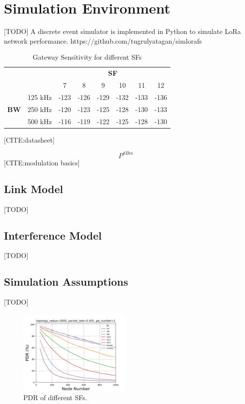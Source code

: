 \documentclass[conference]{IEEEtran}
\begin{document}
\section{Simulation Environment} \label{Simulation Environment}
[TODO] A discrete event simulator is implemented in Python to simulate LoRa network performance. https://github.com/tugrulyatagan/simlorafs

\begin{table}
\centering
\caption{Gateway Sensitivity for different SFs}
\label{table:gw_sf_sensitivity}
\begin{tabular}{|c|c|c|c|c|c|c|c|}
\hline
            &         & \multicolumn{6}{c|}{\textbf{SF}}        \\ \cline{3-8} 
            &         &    7 &    8 &    9 &   10 &   11 &   12 \\ \hline
            & 125 kHz & -123 & -126 & -129 & -132 & -133 & -136 \\ 
\textbf{BW} & 250 kHz & -120 & -123 & -125 & -128 & -130 & -133 \\
            & 500 kHz & -116 & -119 & -122 & -125 & -128 & -130 \\
\hline
\end{tabular}
\end{table}
[CITE:datasheet]


\begin{equation} \label{eq:rx_sensitivity}
P^{dBm}
\end{equation}
[CITE:modulation basics]


\subsection{Link Model}
[TODO]

\subsection{Interference Model}
[TODO]

\subsection{Simulation Assumptions}
[TODO]

\begin{figure}
\centering
\includegraphics[width=0.5\textwidth]{sf_pdr}
\caption{PDR of different SFs.}
\label{fig:sf_pdr}
\end{figure}
\end{document}
